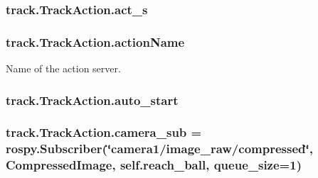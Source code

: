 \subsubsection[{\texorpdfstring{act\+\_\+s}{act_s}}]{\setlength{\rightskip}{0pt plus 5cm}track.\+Track\+Action.\+act\+\_\+s\hspace{0.3cm}{\ttfamily [static]}}\hypertarget{classtrack_1_1TrackAction_ae1870a4393e99629a3835f563374152e}{}\label{classtrack_1_1TrackAction_ae1870a4393e99629a3835f563374152e}
\subsubsection[{\texorpdfstring{action\+Name}{actionName}}]{\setlength{\rightskip}{0pt plus 5cm}track.\+Track\+Action.\+action\+Name\hspace{0.3cm}{\ttfamily [static]}}\hypertarget{classtrack_1_1TrackAction_abb57579f14aa39d1cc0f4379382390a6}{}\label{classtrack_1_1TrackAction_abb57579f14aa39d1cc0f4379382390a6}


Name of the action server. 

\subsubsection[{\texorpdfstring{auto\+\_\+start}{auto_start}}]{\setlength{\rightskip}{0pt plus 5cm}track.\+Track\+Action.\+auto\+\_\+start\hspace{0.3cm}{\ttfamily [static]}}\hypertarget{classtrack_1_1TrackAction_aeb30f796983b2999ad62d71535795668}{}\label{classtrack_1_1TrackAction_aeb30f796983b2999ad62d71535795668}
\subsubsection[{\texorpdfstring{camera\+\_\+sub}{camera_sub}}]{\setlength{\rightskip}{0pt plus 5cm}track.\+Track\+Action.\+camera\+\_\+sub = rospy.\+Subscriber(\char`\"{}camera1/image\+\_\+raw/compressed\char`\"{}, Compressed\+Image, self.\+reach\+\_\+ball, {\bf queue\+\_\+size}=1)\hspace{0.3cm}{\ttfamily [static]}}\hypertarget{classtrack_1_1TrackAction_a71b1a13ec7fb0ba79d6f34416b7d54e1}{}\label{classtrack_1_1TrackAction_a71b1a13ec7fb0ba79d6f34416b7d54e1}


